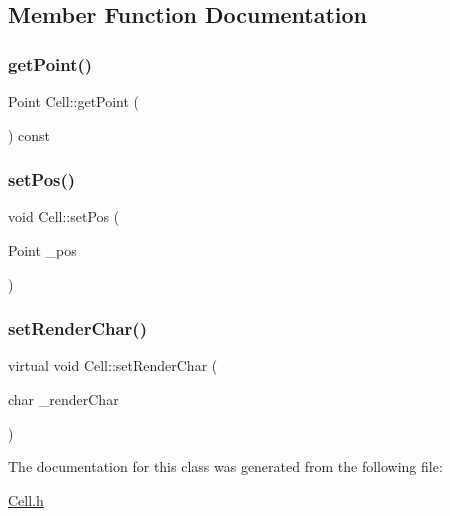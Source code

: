 \subsection{Member Function Documentation}
\mbox{\label{classCell_adb435a236584c42c0ffc77b67e2decc7}} 
\subsubsection{\texorpdfstring{getPoint()}{getPoint()}}
{\footnotesize\ttfamily Point Cell\+::get\+Point (\begin{DoxyParamCaption}{ }\end{DoxyParamCaption}) const}

\mbox{\label{classCell_a2bf0de61827c10b7153dcebb84b47988}} 
\subsubsection{\texorpdfstring{setPos()}{setPos()}}
{\footnotesize\ttfamily void Cell\+::set\+Pos (\begin{DoxyParamCaption}\item[{Point}]{\+\_\+pos }\end{DoxyParamCaption})}

\mbox{\label{classCell_af53171630c52051a690d6f68329ea58e}} 
\subsubsection{\texorpdfstring{setRenderChar()}{setRenderChar()}}
{\footnotesize\ttfamily virtual void Cell\+::set\+Render\+Char (\begin{DoxyParamCaption}\item[{char}]{\+\_\+render\+Char }\end{DoxyParamCaption})\hspace{0.3cm}{\ttfamily [virtual]}}



The documentation for this class was generated from the following file\+:\begin{DoxyCompactItemize}
\item 
\mbox{\hyperlink{Cell_8h}{Cell.\+h}}\end{DoxyCompactItemize}
